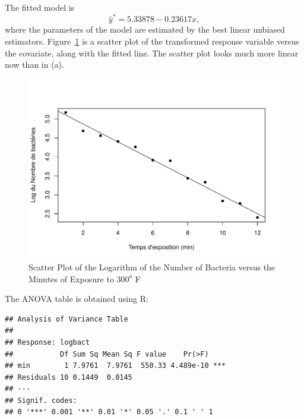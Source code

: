 \begin{solution}{2.22}
\begin{enumerate}
The fitted model is $$\hat{y}^{*}=5.33878-0.23617x,$$ where the parameters of the model are estimated by the best linear unbiased estimators. Figure~\ref{fig:simple:bact5} is a scatter plot of the transformed response variable versus the covariate, along with the fitted line. The scatter plot looks much more linear now than in (a).

\begin{figure}
\begin{center}
\begin{knitrout}
\color{fgcolor}
\includegraphics[width=\maxwidth]{figure/unnamed-chunk-44-1}

\end{knitrout}
\end{center}
\caption{Scatter Plot of the Logarithm of the Number of Bacteria versus the Minutes of Exposure to $300^{o}$ F}
\label{fig:simple:bact5}
\end{figure}

The ANOVA table is obtained using \textsf{R}:
\begin{knitrout}
\color{fgcolor}\begin{kframe}
\begin{alltt}
\end{alltt}
\begin{verbatim}
## Analysis of Variance Table
##
## Response: logbact
##           Df Sum Sq Mean Sq F value    Pr(>F)
## min        1 7.9761  7.9761  550.33 4.489e-10 ***
## Residuals 10 0.1449  0.0145
## ---
## Signif. codes:
## 0 '***' 0.001 '**' 0.01 '*' 0.05 '.' 0.1 ' ' 1
\end{verbatim}
\end{kframe}
\end{knitrout}


\end{enumerate}
\end{solution}
